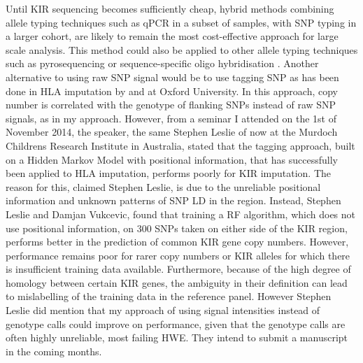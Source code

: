 Until KIR sequencing becomes sufficiently cheap, hybrid methods combining allele typing techniques such as qPCR
in a subset of samples, with SNP typing in a larger cohort, are likely to remain the most cost-effective approach for large scale analysis.  
This method could also be applied to other allele typing techniques such as pyrosequencing \citep{Norman:2009fi} or sequence-specific oligo hybridisation \citep{Martin:2007ik}.
Another alternative to using raw SNP signal would be to use tagging SNP as has been done in HLA imputation by \citet{Leslie:2008dq} and \cite{Dilthey:2013dn} at Oxford University.
In this approach, copy number is correlated with the genotype of flanking SNPs instead of raw SNP signals, as in my approach.
However, from a seminar I attended on the 1st of November 2014, the speaker, the same Stephen Leslie of \citet{Leslie:2008dq} now at the Murdoch Childrens Research Institute in Australia, stated that the tagging approach, built on a Hidden Markov Model with positional information, that has successfully been applied to HLA imputation, performs poorly for KIR imputation.
The reason for this, claimed Stephen Leslie, is due to the unreliable positional information and unknown patterns of SNP \gls{LD} in the region.
Instead, Stephen Leslie and Damjan Vukcevic, found that training a \acrfull{RF} algorithm, which does not use positional information, on 300 SNPs taken on either side of the KIR region, performs better in the prediction of common KIR gene copy numbers.
However, performance remains poor for rarer copy numbers or KIR alleles for which there is insufficient training data available.
Furthermore, because of the high degree of homology between certain KIR genes, the ambiguity in their definition can lead to mislabelling of the training data in the reference panel.
However Stephen Leslie did mention that my approach of using signal intensities instead of genotype calls could improve on performance, given that the genotype calls are often highly unreliable, most failing \gls{HWE}.
They intend to submit a manuscript in the coming months.


